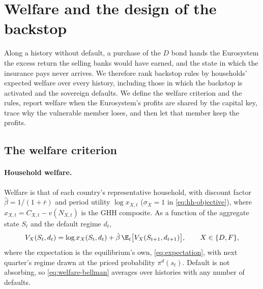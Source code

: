 \section{Welfare and the design of the backstop}
\label{sec:welfare}

Along a history without default, a purchase of the $D$ bond hands the Eurosystem the excess return
the selling banks would have earned, and the state in which the insurance pays never arrives. We
therefore rank backstop rules by households' expected welfare over every history, including those in
which the backstop is activated and the sovereign defaults. We define the welfare criterion
and the rules, report welfare when the Eurosystem's profits are shared by the capital key, trace why
the vulnerable member loses, and then let that member keep the profits.

\subsection{The welfare criterion}
\label{sec:welfare-criterion}

\paragraph{Household welfare.}
Welfare is that of each country's representative household, with discount factor
$\hat\beta=1/(1+\bar r)$ and period utility $\log x_{X,t}$ ($\sigma_X=1$ in \eqref{eq:hh-objective}),
where $x_{X,t}=C_{X,t}-v(N_{X,t})$ is the GHH composite. As a function of the aggregate state $S_t$
and the default regime $d_t$,
\begin{equation}
V_X(S_t,d_t)=\log x_X(S_t,d_t)+\hat\beta\,\E_t\bigl[V_X(S_{t+1},d_{t+1})\bigr],
\qquad X\in\{D,F\},
\label{eq:welfare-bellman}
\end{equation}
where the expectation is the equilibrium's own, \eqref{eq:expectation}, with next quarter's regime
drawn at the priced probability $\pi^{d}(s_t)$. Default is not absorbing, so
\eqref{eq:welfare-bellman} averages over histories with any number of defaults.

